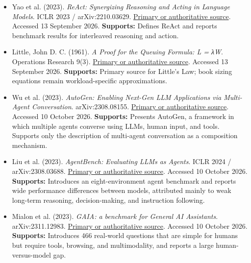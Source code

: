 \begin{itemize}

\item {}\textbf{} Yao et al. (2023). \emph{ReAct: Synergizing Reasoning and Acting in Language Models}. ICLR 2023 / arXiv:2210.03629. \href{\detokenize{https://arxiv.org/abs/2210.03629}}{Primary or authoritative source}. Accessed 13 September 2026. \textbf{Supports:} Defines ReAct and reports benchmark results for interleaved reasoning and action.

\item {}\textbf{} Little, John D. C. (1961). \emph{A Proof for the Queuing Formula: L = λW}. Operations Research 9(3). \href{\detokenize{https://doi.org/10.1287/opre.9.3.383}}{Primary or authoritative source}. Accessed 13 September 2026. \textbf{Supports:} Primary source for Little’s Law; book sizing equations remain workload-specific approximations.

\item {}\textbf{} Wu et al. (2023). \emph{AutoGen: Enabling Next-Gen LLM Applications via Multi-Agent Conversation}. arXiv:2308.08155. \href{\detokenize{https://arxiv.org/abs/2308.08155}}{Primary or authoritative source}. Accessed 10 October 2026. \textbf{Supports:} Presents AutoGen, a framework in which multiple agents converse using LLMs, human input, and tools. Supports only the description of multi-agent conversation as a composition mechanism.

\item {}\textbf{} Liu et al. (2023). \emph{AgentBench: Evaluating LLMs as Agents}. ICLR 2024 / arXiv:2308.03688. \href{\detokenize{https://arxiv.org/abs/2308.03688}}{Primary or authoritative source}. Accessed 10 October 2026. \textbf{Supports:} Introduces an eight-environment agent benchmark and reports wide performance differences between models, attributed mainly to weak long-term reasoning, decision-making, and instruction following.

\item {}\textbf{} Mialon et al. (2023). \emph{GAIA: a benchmark for General AI Assistants}. arXiv:2311.12983. \href{\detokenize{https://arxiv.org/abs/2311.12983}}{Primary or authoritative source}. Accessed 10 October 2026. \textbf{Supports:} Introduces 466 real-world questions that are simple for humans but require tools, browsing, and multimodality, and reports a large human-versus-model gap.


\end{itemize}
